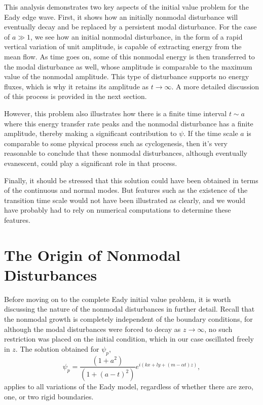 \documentclass[letterpaper,11pt,onecolumn,twoside,titlepage]{article}
\begin{document}
This analysis demonstrates two key aspects of the initial value problem for the Eady edge wave. First, it shows how an initially nonmodal disturbance will eventually decay and be replaced by a persistent modal disturbance. For the case of $a \gg 1$, we see how an initial nonmodal disturbance, in the form of a rapid vertical variation of unit amplitude, is capable of extracting energy from the mean flow. As time goes on, some of this nonmodal energy is then transferred to the modal disturbance as well, whose amplitude is comparable to the maximum value of the nonmodal amplitude. This type of disturbance supports no energy fluxes, which is why it retains its amplitude as $t \rightarrow \infty$. A more detailed discussion of this process is provided in the next section.

However, this problem also illustrates how there is a finite time interval $t \sim a$ where this energy transfer rate peaks and the nonmodal disturbance has a finite amplitude, thereby making a significant contribution to $\psi$. If the time scale $a$ is comparable to some physical process such as cyclogenesis, then it's very reasonable to conclude that these nonmodal disturbances, although eventually evanescent, could play a significant role in that process.

Finally, it should be stressed that this solution could have been obtained in terms of the continuous and normal modes. But features such as the existence of the transition time scale would not have been illustrated as clearly, and we would have probably had to rely on numerical computations to determine these features.


\section{The Origin of Nonmodal Disturbances}

Before moving on to the complete Eady initial value problem, it is worth discussing the nature of the nonmodal disturbances in further detail. Recall that the nonmodal growth is completely independent of the boundary conditions, for although the modal disturbances were forced to decay as $z \rightarrow \infty$, no such restriction was placed on the initial condition, which in our case oscillated freely in $z$. The solution obtained for $\psi_p$,
\[
\psi_p = \frac{(1+a^2)}{(1+(a-t)^2)} e^{i(kx+ly+(m-\alpha t)z)},
\]
applies to all variations of the Eady model, regardless of whether there are zero, one, or two rigid boundaries.
\end{document}
